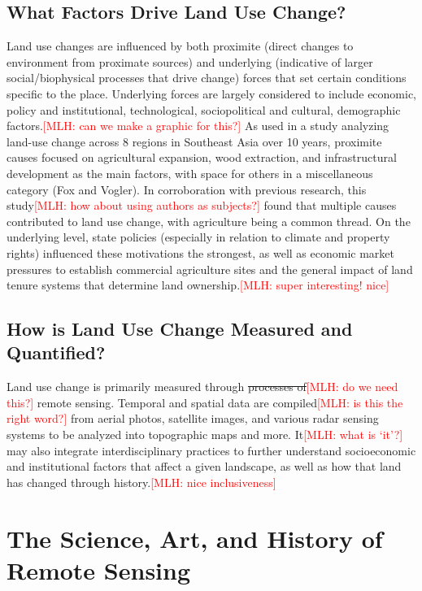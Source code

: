 \documentclass{book}\usepackage{knitr}
\newcommand{\red}[1]{\textcolor{red}{[MLH: #1]}}
\begin{document}
\begin{knitrout}
\begin{kframe}
\subsection{What Factors Drive Land Use Change?}

Land use changes are influenced by both proximite (direct changes to environment from proximate sources) and underlying (indicative of larger social/biophysical processes that drive change) forces that set certain conditions specific to the place. Underlying forces are largely considered to include economic, policy and institutional, technological, sociopolitical and cultural, demographic factors.\red{can we make a graphic for this?} As used in a study analyzing land-use change across 8 regions in Southeast Asia over 10 years, proximite causes focused on agricultural expansion, wood extraction, and infrastructural development as the main factors, with space for others in a miscellaneous category (Fox and Vogler). In corroboration with previous research, this study\red{how about using authors as subjects?} found that multiple causes contributed to land use change, with agriculture being a common thread. On the underlying level, state policies (especially in relation to climate and property rights) influenced these motivations the strongest, as well as economic market pressures to establish commercial agriculture sites and the general impact of land tenure systems that determine land ownership.\red{super interesting!  nice}

\subsection{How is Land Use Change Measured and Quantified?}

Land use change is primarily measured through \st{processes of}\red{do we need this?} remote sensing. Temporal and spatial data are compiled\red{is this the right word?} from aerial photos, satellite images, and various radar sensing systems to be analyzed into topographic maps and more. It\red{what is `it'?} may also integrate interdisciplinary practices to further understand socioeconomic and institutional factors that affect a given landscape, as well as how that land has changed through history.\red{nice inclusiveness}

\section{The Science, Art, and History of Remote Sensing}


\end{kframe}
\end{knitrout}
\end{document}
